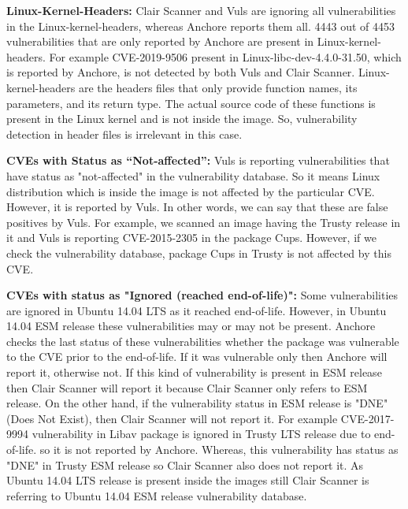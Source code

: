 \documentclass[a4paper,num-refs]{oup-contemporary}
\begin{document}

\textbf{Linux-Kernel-Headers:} Clair Scanner and Vuls are ignoring all vulnerabilities in the Linux-kernel-headers,
whereas Anchore reports them all.
4443 out of 4453 vulnerabilities that are only reported by Anchore are present in Linux-kernel-headers.
For example CVE-2019-9506 present in Linux-libc-dev-4.4.0-31.50, which is reported by Anchore, is not
detected by both Vuls and Clair Scanner.
Linux-kernel-headers are the headers files that only provide function names, its parameters, and its
return type.
The actual source code of these functions is present in the Linux kernel and is not inside the image.
So, vulnerability detection in header files
is irrelevant in this case.

\textbf{CVEs with Status as “Not-affected”:} Vuls is reporting vulnerabilities that have status
as "not-affected" in the vulnerability database. So it means Linux distribution which is inside the image is not affected
by the particular CVE. However, it is reported by Vuls. In other words, we can say that
these are false positives by Vuls.
For example, we scanned an image having the Trusty release in it and Vuls is reporting CVE-2015-2305
in the package Cups. However, if we check the vulnerability database, package Cups in Trusty is not
affected by this CVE.

\textbf{CVEs with status as "Ignored (reached end-of-life)":}
Some vulnerabilities are ignored in Ubuntu 14.04 LTS as it reached end-of-life. 
However, in Ubuntu 14.04 ESM release these vulnerabilities may or may not be present.
Anchore checks the last status of these vulnerabilities whether the package was vulnerable to the CVE
prior to the end-of-life. If it was vulnerable only then Anchore will report it, otherwise not.
If this kind of vulnerability is present in ESM release then Clair Scanner will report it because Clair Scanner
only refers to ESM release. On the other hand, if the vulnerability
status in ESM release is "DNE" (Does Not Exist), then Clair Scanner will not report it. 
For example CVE-2017-9994 vulnerability in Libav package is ignored in Trusty LTS release due to end-of-life.
so it is not reported by Anchore. Whereas, this vulnerability has status as "DNE" in Trusty ESM
release so Clair Scanner also does not report it. As Ubuntu 14.04 LTS release is present inside the images still
Clair Scanner is referring to Ubuntu 14.04 ESM release vulnerability database.
\end{document}
